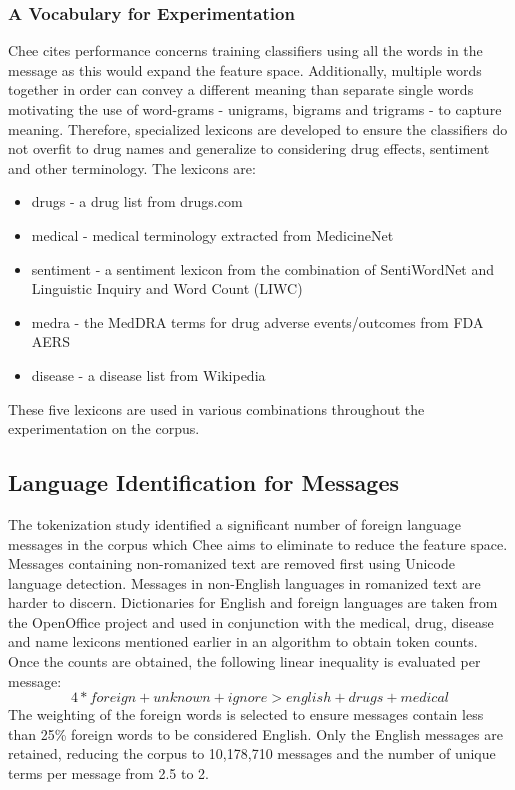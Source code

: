 \documentclass[twoside,11pt]{article}
\begin{document}
\subsubsection{A Vocabulary for Experimentation}
Chee cites performance concerns training classifiers using all the words in the message as this would expand the feature space. Additionally, multiple words together in order can convey a different meaning than separate single words motivating the use of word-grams - unigrams, bigrams and trigrams - to capture meaning. Therefore, specialized lexicons are developed to ensure the classifiers do not overfit to drug names and generalize to considering drug effects, sentiment and other terminology. The lexicons are:
\begin{itemize}
  \item drugs - a drug list from drugs.com
  \item medical - medical terminology extracted from MedicineNet
  \item sentiment - a sentiment lexicon from the combination of SentiWordNet and Linguistic Inquiry and Word Count (LIWC)
  \item medra - the MedDRA terms for drug adverse events/outcomes from FDA AERS
  \item disease - a disease list from Wikipedia
\end{itemize}
These five lexicons are used in various combinations throughout the experimentation on the corpus.

\subsection{Language Identification for Messages}
The tokenization study identified a significant number of foreign language messages in the corpus which Chee aims to eliminate to reduce the feature space. Messages containing non-romanized text are removed first using Unicode language detection. Messages in non-English languages in romanized text are harder to discern. Dictionaries for English and foreign languages are taken from the OpenOffice project and used in conjunction with the medical, drug, disease and name lexicons mentioned earlier in an algorithm to obtain token counts. Once the counts are obtained, the following linear inequality is evaluated per message:
\[
  4 * foreign + unknown + ignore > english + drugs + medical
\]
The weighting of the foreign words is selected to ensure messages contain less than 25\% foreign words to be considered English. Only the English messages are retained, reducing the corpus to 10,178,710 messages and the number of unique terms per message from 2.5 to 2. %
\end{document}
